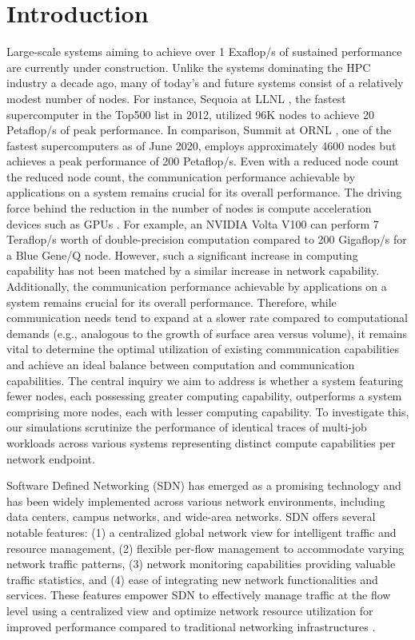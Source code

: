 \chapter{Introduction}

Large-scale systems aiming to achieve over 1 Exaflop/s of sustained performance
are currently under construction. Unlike the systems dominating the HPC industry
a decade ago, many of today's and future systems consist of a relatively modest
number of nodes. For instance, Sequoia at LLNL \cite{sequa}, the fastest supercomputer in
the Top500 list in 2012, utilized 96K nodes to achieve 20 Petaflop/s of peak
performance. In comparison, Summit at ORNL \cite{summit}, one of the fastest
supercomputers as of June 2020, employs approximately 4600 nodes but achieves a
peak performance of 200 Petaflop/s. Even with a reduced node count the reduced node count, the
communication performance achievable by applications on a system remains crucial
for its overall performance.  The driving force behind the reduction in the
number of nodes is compute acceleration devices such as GPUs \cite{owens2008gpu}. For example,
an NVIDIA Volta V100 can perform 7 Teraflop/s worth of double-precision
computation compared to 200 Gigaflop/s for a Blue Gene/Q node. However, such a
significant increase in computing capability has not been matched by a similar
increase in network capability. Additionally, the communication performance
achievable by applications on a system remains crucial for its overall
performance.  Therefore, while communication needs tend to expand at a slower
rate compared to computational demands (e.g., analogous to the growth of surface
area versus volume), it remains vital to determine the optimal utilization of
existing communication capabilities and achieve an ideal balance between
computation and communication capabilities.  The central inquiry we aim to
address is whether a system featuring fewer nodes, each possessing greater
computing capability, outperforms a system comprising more nodes, each with
lesser computing capability. To investigate this, our simulations scrutinize the
performance of identical traces of multi-job workloads across various systems
representing distinct compute capabilities per network endpoint.


Software Defined Networking (SDN) \cite{kreutz2014software} has emerged as a promising technology and
has been widely implemented across various network environments, including data
centers, campus networks, and wide-area networks. SDN offers several notable
features: (1) a centralized global network view for intelligent traffic and
resource management, (2) flexible per-flow management to accommodate varying
network traffic patterns, (3) network monitoring capabilities providing valuable
traffic statistics, and (4) ease of integrating new network functionalities and
services. These features empower SDN to effectively manage traffic at the flow
level using a centralized view and optimize network resource utilization for
improved performance compared to traditional networking infrastructures \cite{tr2016sdn}.

